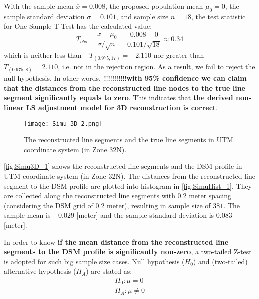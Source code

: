 With the sample mean $\overline{x}=0.008$,
the proposed population mean $\mu_0=0$,
the sample standard deviation $\sigma=0.101$,
and sample size $n=18$, the test statistic for One Sample T Test has the calculated value:
\begin{equation*}
T_{obs} = \frac{\overline{x}-\mu_0}{\sigma/\sqrt{n}}=\frac{0.008-0}{0.101/\sqrt{18}}\approx0.34
\end{equation*}
which is neither less than $-T_{(0.975,17)}=-2.110$ nor greater than $T_{(0.975,8)}=2.110$, i.e. not in the rejection region. As a result, we fail to reject the null hypothesis. In other words, !!!!!!!!!!!!\textbf{with 95\% confidence we can claim that the distances from the reconstructed line nodes to the true line segment significantly equals to zero}. This indicates that \textbf{the derived non-linear LS adjustment model for 3D reconstruction is correct}.


\begin{figure}
  \centering
  \texttt{[image: Simu\_3D\_2.png]} %
  \caption{\small The reconstructed line segments and the true line segments in UTM coordinate system (in Zone 32N).}
  \label{fig:Simu3D_2}
\end{figure}

\clearpage

\cref{fig:Simu3D_1} shows the reconstructed line segments and the DSM profile in UTM coordinate system (in Zone 32N). The distances from the reconstructed line segment to the DSM profile are plotted into histogram in \cref{fig:SimuHist_1}. They are collected along the reconstructed line segments with 0.2 meter spacing (considering the DSM grid of 0.2 meter), resulting in sample size of $381$. The sample mean is $-0.029$ [meter] and the sample standard deviation is $0.083$ [meter]. %

In order to know \textbf{if the mean distance from the reconstructed line segments to the DSM profile is significantly non-zero}, a two-tailed Z-test is adopted for such big sample size cases. Null hypothesis ($H_0$) and (two-tailed) alternative hypothesis ($H_A$) are stated as:
\begin{equation*}
\begin{split}
H_0: \mu=0\\
H_A: \mu\neq0
\end{split}
\end{equation*}

